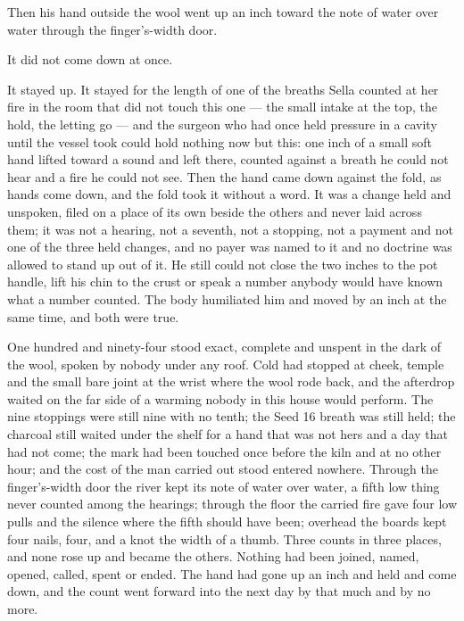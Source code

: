 Then his hand outside the wool went up an inch toward the note of water over water through the finger's-width door.

It did not come down at once.

It stayed up. It stayed for the length of one of the breaths Sella counted at her fire in the room that did not touch this one --- the small intake at the top, the hold, the letting go --- and the surgeon who had once held pressure in a cavity until the vessel took could hold nothing now but this: one inch of a small soft hand lifted toward a sound and left there, counted against a breath he could not hear and a fire he could not see. Then the hand came down against the fold, as hands come down, and the fold took it without a word. It was a change held and unspoken, filed on a place of its own beside the others and never laid across them; it was not a hearing, not a seventh, not a stopping, not a payment and not one of the three held changes, and no payer was named to it and no doctrine was allowed to stand up out of it. He still could not close the two inches to the pot handle, lift his chin to the crust or speak a number anybody would have known what a number counted. The body humiliated him and moved by an inch at the same time, and both were true.

One hundred and ninety-four stood exact, complete and unspent in the dark of the wool, spoken by nobody under any roof. Cold had stopped at cheek, temple and the small bare joint at the wrist where the wool rode back, and the afterdrop waited on the far side of a warming nobody in this house would perform. The nine stoppings were still nine with no tenth; the Seed 16 breath was still held; the charcoal still waited under the shelf for a hand that was not hers and a day that had not come; the mark had been touched once before the kiln and at no other hour; and the cost of the man carried out stood entered nowhere. Through the finger's-width door the river kept its note of water over water, a fifth low thing never counted among the hearings; through the floor the carried fire gave four low pulls and the silence where the fifth should have been; overhead the boards kept four nails, four, and a knot the width of a thumb. Three counts in three places, and none rose up and became the others. Nothing had been joined, named, opened, called, spent or ended. The hand had gone up an inch and held and come down, and the count went forward into the next day by that much and by no more.
